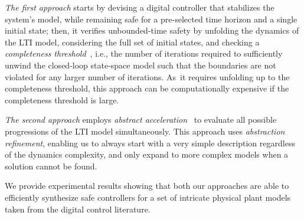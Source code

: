 \documentclass[submission]{eptcs}
\begin{document}
\emph{The first approach} starts by devising a
digital controller that stabilizes the system's model, while remaining safe for a
pre-selected time horizon and a single initial state; then, it verifies
unbounded-time safety by unfolding the dynamics of the LTI model, considering the
full set of initial states, and checking a \emph{completeness
threshold}~\cite{DBLP:conf/vmcai/KroeningS03}, i.e., the number of
iterations required to sufficiently unwind the closed-loop state-space
model such that the boundaries are not violated for any larger number of
iterations.  As~it requires unfolding up to the completeness threshold, this
approach can be computationally expensive if the completeness threshold is large.

\emph{The second approach}
employs \emph{abstract acceleration}~\cite{cattaruzza2015unbounded} to
evaluate all possible progressions of the LTI model simultaneously. 
This approach uses \emph{abstraction refinement},
enabling us to always start with a very simple description regardless of the
dynamics complexity, and only expand to more complex models
when a solution cannot be found.

We provide experimental results showing that both our approaches are able to
efficiently synthesize safe controllers for a set of intricate physical
plant models taken from the digital control literature.

       
  
\end{document}
